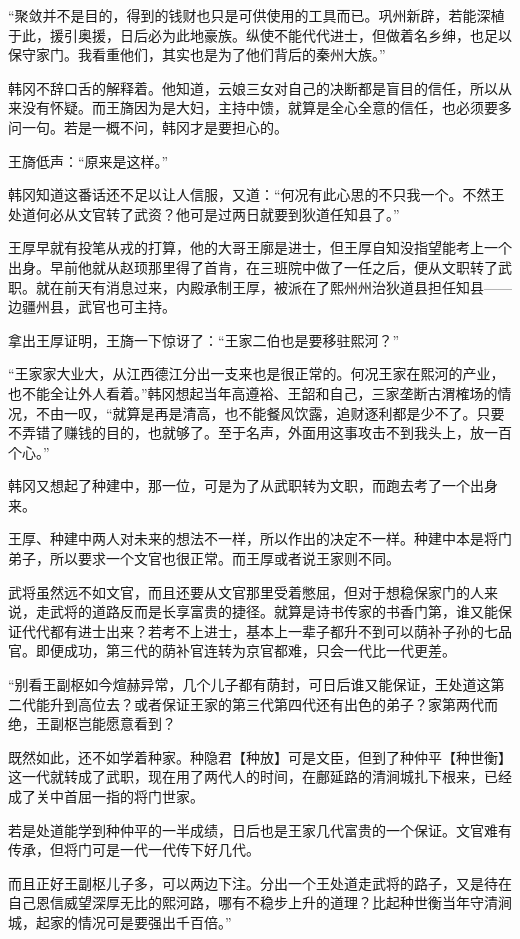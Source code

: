 “聚敛并不是目的，得到的钱财也只是可供使用的工具而已。巩州新辟，若能深植于此，援引奥援，日后必为此地豪族。纵使不能代代进士，但做着名乡绅，也足以保守家门。我看重他们，其实也是为了他们背后的秦州大族。”

韩冈不辞口舌的解释着。他知道，云娘三女对自己的决断都是盲目的信任，所以从来没有怀疑。而王旖因为是大妇，主持中馈，就算是全心全意的信任，也必须要多问一句。若是一概不问，韩冈才是要担心的。

王旖低声：“原来是这样。”

韩冈知道这番话还不足以让人信服，又道：“何况有此心思的不只我一个。不然王处道何必从文官转了武资？他可是过两日就要到狄道任知县了。”

王厚早就有投笔从戎的打算，他的大哥王廓是进士，但王厚自知没指望能考上一个出身。早前他就从赵顼那里得了首肯，在三班院中做了一任之后，便从文职转了武职。就在前天有消息过来，内殿承制王厚，被派在了熙州州治狄道县担任知县——边疆州县，武官也可主持。

拿出王厚证明，王旖一下惊讶了：“王家二伯也是要移驻熙河？”

“王家家大业大，从江西德江分出一支来也是很正常的。何况王家在熙河的产业，也不能全让外人看着。”韩冈想起当年高遵裕、王韶和自己，三家垄断古渭榷场的情况，不由一叹，“就算是再是清高，也不能餐风饮露，追财逐利都是少不了。只要不弄错了赚钱的目的，也就够了。至于名声，外面用这事攻击不到我头上，放一百个心。”

韩冈又想起了种建中，那一位，可是为了从武职转为文职，而跑去考了一个出身来。

王厚、种建中两人对未来的想法不一样，所以作出的决定不一样。种建中本是将门弟子，所以要求一个文官也很正常。而王厚或者说王家则不同。

武将虽然远不如文官，而且还要从文官那里受着憋屈，但对于想稳保家门的人来说，走武将的道路反而是长享富贵的捷径。就算是诗书传家的书香门第，谁又能保证代代都有进士出来？若考不上进士，基本上一辈子都升不到可以荫补子孙的七品官。即便成功，第三代的荫补官连转为京官都难，只会一代比一代更差。

“别看王副枢如今煊赫异常，几个儿子都有荫封，可日后谁又能保证，王处道这第二代能升到高位去？或者保证王家的第三代第四代还有出色的弟子？家第两代而绝，王副枢岂能愿意看到？

既然如此，还不如学着种家。种隐君【种放】可是文臣，但到了种仲平【种世衡】这一代就转成了武职，现在用了两代人的时间，在鄜延路的清涧城扎下根来，已经成了关中首屈一指的将门世家。

若是处道能学到种仲平的一半成绩，日后也是王家几代富贵的一个保证。文官难有传承，但将门可是一代一代传下好几代。

而且正好王副枢儿子多，可以两边下注。分出一个王处道走武将的路子，又是待在自己恩信威望深厚无比的熙河路，哪有不稳步上升的道理？比起种世衡当年守清涧城，起家的情况可是要强出千百倍。”

